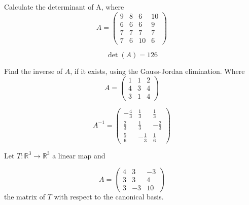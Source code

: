 \begin{questions}

\question Calculate the determinant of A, where
$$
A=\left(\begin{array}{rrrr}
9 & 8 & 6 & 10 \\
6 & 6 & 6 & 9 \\
7 & 7 & 7 & 7 \\
7 & 6 & 10 & 6
\end{array}\right)
$$

\begin{solution}
$$\det(A)=126$$
\end{solution}

\question Find the inverse of $A$, if it exists, using the Gauss-Jordan elimination. Where
$$
A=\left(\begin{array}{rrr}
1 & 1 & 2 \\
4 & 3 & 4 \\
3 & 1 & 4
\end{array}\right)
$$

\begin{solution}
$$A^{-1}=\left(\begin{array}{rrr}
-\frac{4}{3} & \frac{1}{3} & \frac{1}{3} \\
\frac{2}{3} & \frac{1}{3} & -\frac{2}{3} \\
\frac{5}{6} & -\frac{1}{3} & \frac{1}{6}
\end{array}\right)$$
\end{solution}

\question Let $T:\mathbb{R}^3\rightarrow\mathbb{R}^3$  a linear map and
 
$$
A=\left(\begin{array}{rrr}
4 & 3 & -3 \\
3 & 3 & 4 \\
3 & -3 & 10
\end{array}\right)
$$
the matrix of $T$ with respect to the canonical basis.
\end{questions}
